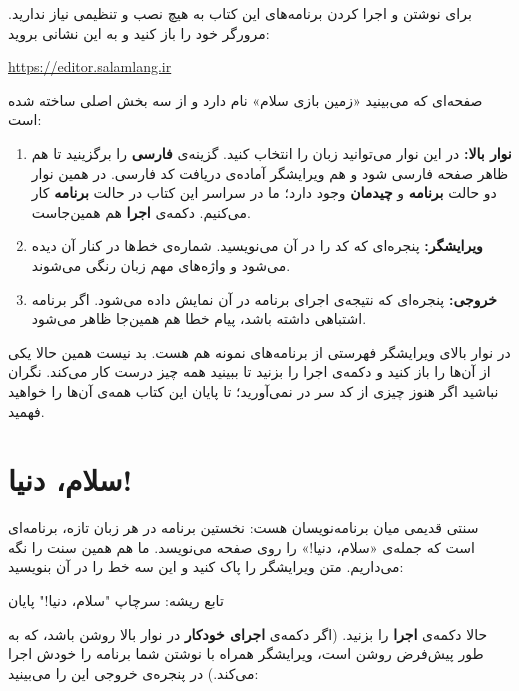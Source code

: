 برای نوشتن و اجرا کردن برنامه‌های این کتاب به هیچ نصب و تنظیمی نیاز
ندارید. مرورگر خود را باز کنید و به این نشانی بروید:
\begin{center}
\url{https://editor.salamlang.ir}
\end{center}
صفحه‌ای که می‌بینید «زمین بازی سلام» نام دارد و از سه بخش اصلی ساخته شده
است:
\begin{enumerate}
  \item \textbf{نوار بالا:} در این نوار می‌توانید زبان را انتخاب کنید. گزینه‌ی
        \textbf{فارسی} را برگزینید تا هم ظاهر صفحه فارسی شود و هم ویرایشگر
        آماده‌ی دریافت کد فارسی. در همین نوار دو حالت \textbf{برنامه} و
        \textbf{چیدمان} وجود دارد؛ ما در سراسر این کتاب در حالت
        \textbf{برنامه} کار می‌کنیم. دکمه‌ی \textbf{اجرا} هم همین‌جاست.
  \item \textbf{ویرایشگر:} پنجره‌ای که کد را در آن می‌نویسید. شماره‌ی خط‌ها
        در کنار آن دیده می‌شود و واژه‌های مهم زبان رنگی می‌شوند.
  \item \textbf{خروجی:} پنجره‌ای که نتیجه‌ی اجرای برنامه در آن نمایش داده
        می‌شود. اگر برنامه اشتباهی داشته باشد، پیام خطا هم همین‌جا ظاهر
        می‌شود.
\end{enumerate}

\begin{tip}
در نوار بالای ویرایشگر فهرستی از برنامه‌های نمونه هم هست. بد نیست همین حالا
یکی از آن‌ها را باز کنید و دکمه‌ی اجرا را بزنید تا ببینید همه چیز درست کار
می‌کند. نگران نباشید اگر هنوز چیزی از کد سر در نمی‌آورید؛ تا پایان این
کتاب همه‌ی آن‌ها را خواهید فهمید.
\end{tip}

\section{سلام، دنیا!}

سنتی قدیمی میان برنامه‌نویسان هست: نخستین برنامه در هر زبان تازه، برنامه‌ای
است که جمله‌ی «سلام، دنیا!» را روی صفحه می‌نویسد. ما هم همین سنت را نگه
می‌داریم. متن ویرایشگر را پاک کنید و این سه خط را در آن بنویسید:

\begin{salamfa}
تابع ریشه:
    سرچاپ "سلام، دنیا!"
پایان
\end{salamfa}

حالا دکمه‌ی \textbf{اجرا} را بزنید. (اگر دکمه‌ی \textbf{اجرای خودکار} در نوار بالا روشن
باشد، که به طور پیش‌فرض روشن است، ویرایشگر همراه با نوشتن شما برنامه را خودش
اجرا می‌کند.) در پنجره‌ی خروجی این را می‌بینید:

